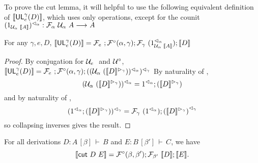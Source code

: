 \documentclass{drl-common/llncs}
\renewcommand{\sem}[1]{\ensuremath{ \llbracket #1 \rrbracket}}
\newcommand{\arrow}[3]{\ensuremath{#2 \longrightarrow_{#1} #3}}
\newcommand\seq[3]{\ensuremath{#1 \, [ #2 ] \, \vdash \, #3}}
\newcommand\cutsym{\ensuremath{\dsd{cut}}}
\newcommand\cut[2]{\ensuremath{{\cutsym \,\, #1 \,\, #2}}}
\newcommand\UL[3]{\ensuremath{\dsd{UL}^{#1}_{#2}(#3)}}
\begin{document}
To prove the cut lemma, it will helpful to use the following equivalent
definition of \sem{\UL{\gamma}{e}{D}}, which uses only \semF{}{}
operations, except for the counit
$\semrtol{(1_{\semU{\alpha}{\sem{A}}})}{\alpha} :
\arrow{}{\semF{\alpha}{\semU{\alpha}{A}}}{A}$

\begin{lemma}\label{lem:semulalt}
For any $\gamma,e,D$, 
$\sem{\UL \gamma e D}  = \semF{e};\semFcomp(\alpha,\gamma);\semF{\gamma}{(\semrtol{1_{\semU{\alpha}{\sem{A}}}}{\alpha})};\sem{D}$
\end{lemma}

\begin{proof}
By conjugation for $\semU{e}$ and $\mathcal{U}^\circ$, $\sem{\UL \gamma e D} = 
\semF{e};\semFcomp(\alpha,\gamma);\semrtol{(\semrtol{(\semU{\alpha}{(\semltor{\sem{D}}{\gamma})})}{\alpha})}{\gamma}$
By naturality of \semrtol{-}{\alpha},
\[
{\semrtol{(\semU{\alpha}{(\semltor{\sem{D}}{\gamma})})}{\alpha}} = 
\semrtol{1}{\alpha};{{(\semltor{\sem{D}}{\gamma})}} 
\]
and by naturality of \semrtol{-}{\gamma},
\[
\semrtol{(\semrtol{1}{\alpha};{{(\semltor{\sem{D}}{\gamma})}})}{\gamma}
= \semF{\gamma}{(\semrtol{1}{\alpha})};\semrtol{{{(\semltor{\sem{D}}{\gamma})}}}{\gamma}
\]
so collapsing inverses gives the result.  
\end{proof}

\begin{lemma}\label{lem:semcut}
  For all derivations $D : \seq{A}{\beta}{B}$ and $E : \seq{B}{\beta'}{C}$, we have
  \[\sem{\cut D E} = {\semFcomp(\beta,\beta')};{\semF{\beta'}{\sem{D}}};{\sem{E}}. \]
\end{lemma}

\newcommand{\semofcut}[2]{{\semFcomp(\beta,\beta')};{\semF{\beta'}{\sem{#1}}};{\sem{#2}}}
\end{document}
